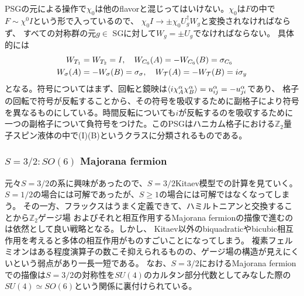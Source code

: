 \documentclass[11pt, aps, longbibliography]{article}
\begin{document}
        PSGの元による操作で$\chi_0$は他のflavorと混じってはいけない。$\chi_0$は$F$の中で$F\sim \chi^0I$という形で入っているので、
        $\chi_0I \rightarrow \pm \chi_0 U_g^\dagger W_g$と変換されなければならず、
        すべての対称群の元$g\in$ SGに対して$W_g=\pm U_g$でなければならない。
        具体的には
        \begin{align}\label{eq:Kit-Sym-9}
            W_{T_1} &= W_{T_2} = I, \quad W_{C_6}(A) = -W_{C_6}(B) = \sigma_{C_6} \\
            W_\sigma(A) &= -W_\sigma(B) = \sigma_\sigma, \quad W_\mathcal{T}(A) = -W_\mathcal{T}(B) = i\sigma_y \notag
        \end{align}
        となる。符号についてはまず、回転と鏡映は$\expval{i\chi_A^\alpha \chi_B^\alpha} = u_{ij}^\alpha = -u_{ji}^\alpha$であり、
        格子の回転で符号が反転することから、その符号を吸収するために副格子により符号を異なるものにしている。時間反転についても$i$が反転するのを吸収するために
        一つの副格子について負符号をつけた。このPSGはハニカム格子における$\mathbb{Z}_2$量子スピン液体の中で(I)(B)というクラスに分類されるものである。

        \subsubsection{$S=3/2: SO(6)$ Majorana fermion}
        元々$S=3/2$の系に興味があったので、$S=3/2$Kitaev模型での計算を見ていく。
        $S=1/2$の場合には可解であったが、$S\geq 1$の場合には可解ではなくなってしまう。
        その一方、フラックスはうまく定義できて、ハミルトニアンと交換することから$\mathbb{Z}_2$ゲージ場
        およびそれと相互作用するMajorana fermionの描像で進むのは依然として良い戦略となる。しかし、
        Kitaev以外のbiquadraticやbicubic相互作用を考えると多体の相互作用がものすごいことになってしまう。
        複素フェルミオンはある程度演算子の数こそ抑えられるものの、ゲージ場の構造が見えにくいという弱点があり一長一短である。
        なお、$S=3/2$におけるMajorana fermionでの描像は$S=3/2$の対称性を$SU(4)$のカルタン部分代数としてみなした際の$SU(4)\simeq SO(6)$という関係に裏付けられている。
\end{document}
